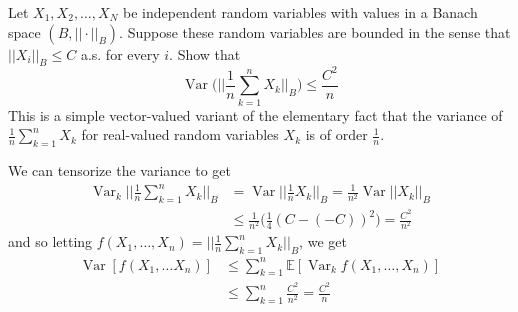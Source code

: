 \documentclass{article}
\DeclareMathOperator{\Var}{Var}
\theoremstyle{definition}
\theoremstyle{remark}
\theoremstyle{definition}
\begin{document}
  \begin{exercise}
  Let $X_1, X_2, \ldots, X_N$ be independent random variables with values in a Banach space $(B, ||\cdot ||_B)$. Suppose these random variables are bounded in the sense that $||X_i||_B \leq C$ a.s. for every $i$. Show that 
  \[\Var\bigg( \bigg| \bigg| \frac{1}{n} \sum_{k=1}^n X_k \bigg| \bigg|_B \bigg) \leq \frac{C^2}{n}\]
  This is a simple vector-valued variant of the elementary fact that the variance of $\frac{1}{n} \sum_{k=1}^n X_k$ for real-valued random variables $X_k$ is of order $\frac{1}{n}$. 
  \end{exercise}
  \begin{solution}
  We can tensorize the variance to get 
  \begin{align*}
      \Var_k \bigg| \bigg| \frac{1}{n} \sum_{k=1}^n X_k \bigg| \bigg|_B & = \Var \bigg| \bigg| \frac{1}{n} X_k \bigg| \bigg|_B = \frac{1}{n^2} \Var ||X_k||_B \\
      & \leq \frac{1}{n^2} \bigg( \frac{1}{4} (C - (-C))^2 \bigg) = \frac{C^2}{n^2} 
  \end{align*}
  and so letting $f(X_1, \ldots, X_n) = \big| \big| \frac{1}{n} \sum_{k=1}^n X_k \big| \big|_B$, we get 
  \begin{align*}
      \Var [f(X_1, \ldots X_n)] & \leq \sum_{k=1}^n \mathbb{E}[ \Var_k f (X_1, \ldots, X_n)] \\
      & \leq \sum_{k=1}^n \frac{C^2}{n^2} = \frac{C^2}{n} 
  \end{align*}
  \end{solution}
\end{document}
